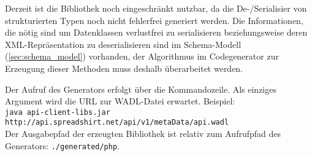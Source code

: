 Derzeit ist die Bibliothek noch eingeschränkt nutzbar, da die De-/Serialisier von strukturierten Typen noch nicht fehlerfrei generiert werden. Die Informationen, die nötig sind um Datenklassen verlustfrei zu serialisieren beziehungsweise deren \gls{XML}-Repräsentation zu deserialisieren sind im Schema-Modell (\cref{sec:schema_model}) vorhanden, der Algorithmus im Codegenerator zur Erzeugung dieser Methoden muss deshalb überarbeitet werden.

Der Aufruf des Generators erfolgt über die Kommandozeile. Als einziges Argument wird die \gls{URL} zur \gls{WADL}-Datei erwartet. Beispiel:\\ 
{\footnotesize \texttt{java api-client-libs.jar http://api.spreadshirt.net/api/v1/metaData/api.wadl}}\\
Der Ausgabepfad der erzeugten Bibliothek ist relativ zum Aufrufpfad des Generators: \texttt{./generated/php}.
